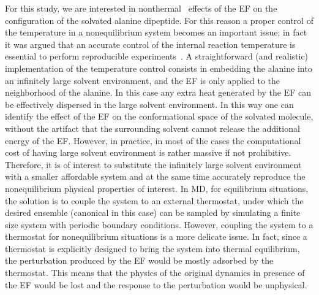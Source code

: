 \documentclass[a4paper,preprint,unsortedaddress,onecolumn]{revtex4-1}
\begin{document}
For this study, we are interested in 
nonthermal~\cite{delaHoz2005microwaves} effects of the EF
on the configuration of the solvated alanine dipeptide.
For this reason a proper control of the temperature in a nonequilibrium system
becomes an important issue; in fact it was argued that  an
accurate control of the internal reaction temperature is essential to
perform reproducible experiments~\cite{damm2012can}.
A straightforward (and realistic) implementation of the temperature control consists in 
embedding the alanine into an infinitely large solvent environment, and 
the EF is only applied to the neighborhood of the alanine. In this case
any extra heat generated by the EF can be effectively
dispersed in the large solvent environment.
In this way one can identify the effect of the EF on the conformational space of the solvated molecule,
without the artifact that the surrounding solvent cannot release the additional energy of the EF.
However, in practice, in most of the cases the computational cost of having large solvent environment is rather massive if not prohibitive.
Therefore, it is of interest to substitute the infinitely large
solvent environment with a smaller affordable system and at the same time accurately reproduce the nonequilibrium
physical properties of interest.
In MD, for equilibrium situations, the solution is to couple
the system to an external thermostat, under which the desired ensemble
(canonical in this case) can be
sampled by simulating a finite size system with periodic boundary
conditions.
However, coupling the system to a thermostat for nonequilibrium situations is a more delicate issue.
In fact, since a thermostat is explicitly designed to bring the system into
thermal equilibrium,
the perturbation produced by the EF would be mostly adsorbed by the thermostat. This means that the physics of the original dynamics in presence of the EF
would be lost and the response to the perturbation would be unphysical. 
\end{document}
